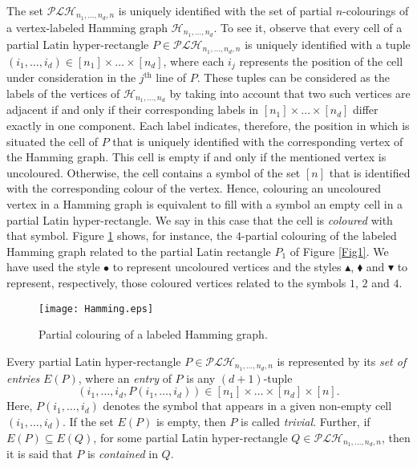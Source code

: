 \documentclass{article}
\begin{document}
The set $\mathcal{PLH}_{n_1,\ldots,n_d,n}$ is uniquely identified with the set of partial $n$-colour\-ings of a vertex-labeled Hamming graph $\mathcal{H}_{n_1,\ldots,n_d}$. To see it, 
observe that every cell of a partial Latin hyper-rectangle $P\in \mathcal{PLH}_{n_1,\ldots,n_d,n}$ is uniquely identified with a tuple $(i_1,\ldots,i_d)\in [n_1]\times \ldots \times [n_d]$, where each $i_j$ represents the position of the cell under consideration in the $j^{\mathrm{th}}$ line of $P$. These tuples can be considered as the labels of the vertices of $\mathcal{H}_{n_1,\ldots,n_d}$ by taking into account that two such vertices are adjacent if and only if their corresponding labels in $[n_1]\times \ldots \times [n_d]$ differ exactly in one component. Each label indicates, therefore, the position in which is situated the cell of $P$ that is uniquely identified with the corresponding vertex of the Hamming graph. This cell is empty if and only if the mentioned vertex is uncoloured. Otherwise, the cell contains a symbol of the set $[n]$ that is identified with the corresponding colour of the vertex. Hence, colouring an uncoloured vertex in a Hamming graph is equivalent to fill with a symbol an empty cell in a partial Latin hyper-rectangle. We say in this case that the cell is {\em coloured} with that symbol. Figure \ref{Fig_Hamming} shows, for instance, the $4$-partial colouring of the labeled Hamming graph related to the partial Latin rectangle $P_1$ of Figure \ref{Fig1}. We have used the style $\bullet$ to represent uncoloured vertices and the styles $\blacktriangle$, $\blacklozenge$ and $\blacktriangledown$ to represent, respectively, those coloured vertices related to the symbols $1$, $2$ and $4$.

\begin{figure}[htbp]
\begin{center}
\texttt{[image: Hamming.eps]}
\end{center}
\caption{Partial colouring of a labeled Hamming graph.}
\label{Fig_Hamming}
\end{figure}

 Every partial Latin hyper-rectangle $P\in \mathcal{PLH}_{n_1,\ldots,n_d,n}$ is represented by its {\em set of entries} $E(P)$, where an {\em entry} of $P$ is any $(d+1)$-tuple 
\[(i_1,\ldots,i_d,P(i_1,\ldots,i_d))\in [n_1]\times \ldots \times [n_d]\times [n].\] 
Here, $P(i_1,\ldots,i_d)$ denotes the symbol that appears in a given non-empty cell $(i_1,\ldots,i_d)$. If the set $E(P)$ is empty, then 
$P$ is called {\em trivial}. Further, if 
 $E(P)\subseteq E(Q)$, for some partial Latin hyper-rectangle $Q\in \mathcal{PLH}_{n_1,\ldots,n_d,n}$, then it is said that $P$ is {\em contained} in $Q$.
\end{document}
